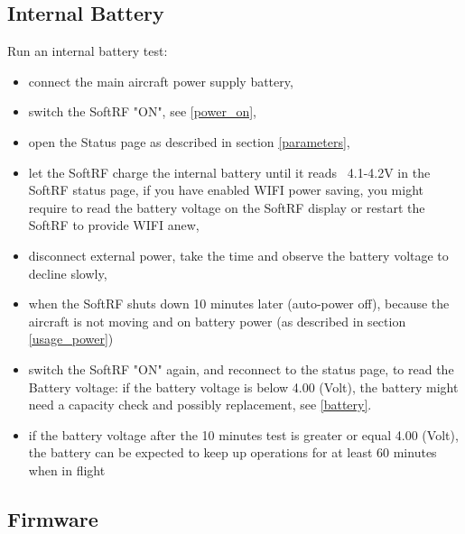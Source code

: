 \documentclass[11pt,a4paper]{article}
\begin{document}
\subsection{Internal Battery}\label{maint_battery}
Run an internal battery test:

\begin{itemize}
\item connect the main aircraft power supply battery,
\item switch the SoftRF "ON", see \ref{power_on},
\item open the Status page as described in section \ref{parameters},
\item let the SoftRF charge the internal battery until it reads ~4.1-4.2V in the SoftRF status page, if you have enabled WIFI power saving, you might require to read the battery voltage on the SoftRF display or restart the SoftRF to provide WIFI anew,
\item disconnect external power, take the time and observe the battery voltage to decline slowly,
\item when the SoftRF shuts down 10 minutes later (auto-power off), because the aircraft is not moving and on battery power (as described in section \ref{usage_power})
\item switch the SoftRF "ON" again, and reconnect to the status page, to read the Battery voltage: if the battery voltage is below 4.00 (Volt), the battery might need a capacity check and possibly replacement, see \ref{battery}.
\item if the battery voltage after the 10 minutes test is greater or equal 4.00 (Volt), the battery can be expected to keep up operations for at least 60 minutes when in flight
\end{itemize}

\subsection{Firmware}
\end{document}
